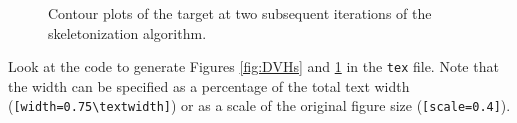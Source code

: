 \documentclass[12pt]{article}
\begin{document}
\begin{figure}[tbp]
	\begin{center}
	\end{center}
	\caption{Contour plots of the target at two subsequent iterations of the skeletonization algorithm.}
	\label{fig:cluster}
\end{figure}

Look at the code to generate Figures \ref{fig:DVHs} and \ref{fig:cluster} in the \texttt{tex} file. Note that the width can be specified as a percentage of the total text width (\verb![width=0.75\textwidth]!) or as a scale of the original figure size (\verb![scale=0.4]!). 
\end{document}
